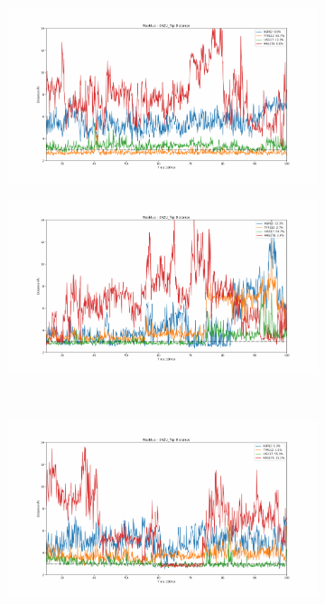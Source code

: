 \documentclass[fleqn,10pt]{wlscirep}
\begin{document}
\begin{figure}[!ht]
\centering
  \begin{subfigure}{.45\textwidth}
     \centering
     \includegraphics[width=.95\linewidth]{2AZU_flip/2AZU_flip-dist_0.pdf}
  \end{subfigure}
  \begin{subfigure}{.45\textwidth}
     \centering
     \includegraphics[width=.95\linewidth]{2AZU_flip/2AZU_flip-dist_1.pdf}
  \end{subfigure}
  \\
  \begin{subfigure}{.45\textwidth}
     \centering
     \includegraphics[width=.95\linewidth]{2AZU_flip/2AZU_flip-dist_2.pdf}

\end{subfigure}
\end{figure}
\end{document}
